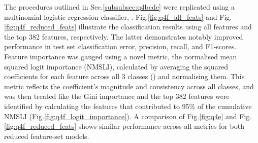     The procedures outlined in Sec.\eqref{subsubsec:q4bcde} were replicated using a multinomial logistic regression
    classifier, .
    Fig.\eqref{fig:q4f_all_feats} and Fig.\eqref{fig:q4f_reduced_feats} illustrate the classification results using all
    features and the top 382 features, respectively.
    The latter demonstrates notably improved performance in test set classification error, precision, recall, and F1-scores.
    Feature importance was gauged using a novel metric, the normalised mean squared logit importance (NMSLI), calculated
    by averaging the squared coefficients for each feature across all 3 classes () and
    normalising them.
    This metric reflects the coefficient's magnitude and consistency across all classes, and was then treated like the
    Gini importance and the top 382 features were identified by calculating the features that contributed to 95\% of the
    cumulative NMSLI (Fig.\eqref{fig:q4f_logit_importance}).
    A comparison of Fig.\eqref{fig:q4e} and Fig.\eqref{fig:q4f_reduced_feats} shows similar performance across all
    metrics for both reduced feature-set models.
